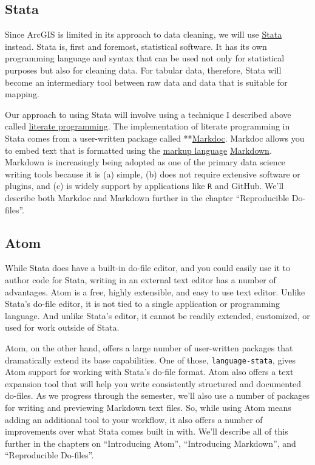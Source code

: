 \documentclass[]{book}
\begin{document}
\subsection{Stata}\label{stata}

Since ArcGIS is limited in its approach to data cleaning, we will use
\href{http://stata.com}{Stata} instead. Stata is, first and foremost,
statistical software. It has its own programming language and syntax
that can be used not only for statistical purposes but also for cleaning
data. For tabular data, therefore, Stata will become an intermediary
tool between raw data and data that is suitable for mapping.

Our approach to using Stata will involve using a technique I described
above called
\href{https://en.wikipedia.org/wiki/Literate_programming}{literate
programming}. The implementation of literate programming in Stata comes
from a user-written package called
**\href{http://haghish.com/statistics/stata-blog/reproducible-research/markdoc.php}{Markdoc}.
Markdoc allows you to embed text that is formatted using the
\href{https://en.wikipedia.org/wiki/Markup_language}{markup language}
\href{https://daringfireball.net/projects/markdown/}{Markdown}. Markdown
is increasingly being adopted as one of the primary data science writing
tools because it is (a) simple, (b) does not require extensive software
or plugins, and (c) is widely support by applications like \texttt{R}
and GitHub. We'll describe both Markdoc and Markdown further in the
chapter ``Reproducible Do-files''.

\subsection{Atom}\label{atom}

While Stata does have a built-in do-file editor, and you could easily
use it to author code for Stata, writing in an external text editor has
a number of advantages. Atom is a free, highly extensible, and easy to
use text editor. Unlike Stata's do-file editor, it is not tied to a
single application or programming language. And unlike Stata's editor,
it cannot be readily extended, customized, or used for work outside of
Stata.

Atom, on the other hand, offers a large number of user-written packages
that dramatically extend its base capabilities. One of those,
\texttt{language-stata}, gives Atom support for working with Stata's
do-file format. Atom also offers a text expansion tool that will help
you write consistently structured and documented do-files. As we
progress through the semester, we'll also use a number of packages for
writing and previewing Markdown text files. So, while using Atom means
adding an additional tool to your workflow, it also offers a number of
improvements over what Stata comes built in with. We'll describe all of
this further in the chapters on ``Introducing Atom'', ``Introducing
Markdown'', and ``Reproducible Do-files''.
\end{document}

